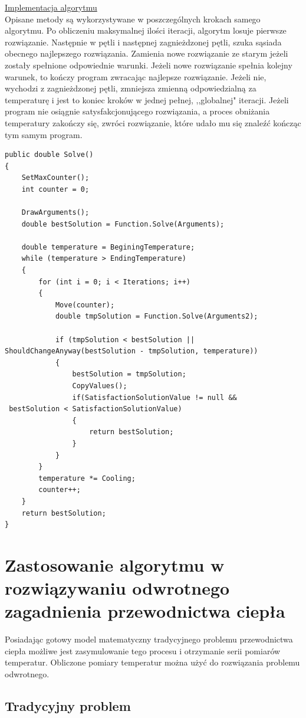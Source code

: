 \documentclass[twoside]{projektInzynierskiMS1}
\newcommand{\si}{ś}
\begin{document}
\underline{Implementacja algorytmu} \\
Opisane metody są wykorzystywane w poszczególnych krokach samego algorytmu. Po obliczeniu maksymalnej ilo\si ci iteracji, algorytm losuje pierwsze rozwiązanie. Następnie w pętli i następnej zagnieżdzonej pętli, szuka sąsiada obecnego najlepszego rozwiązania. Zamienia nowe rozwiązanie ze starym jeżeli zostały spełnione odpowiednie warunki. Jeżeli nowe rozwiązanie spełnia kolejny warunek, to kończy program zwracając najlepsze rozwiązanie. Jeżeli nie, wychodzi z zagnieżdzonej pętli, zmniejsza zmienną odpowiedzialną za temperaturę i jest to koniec kroków w jednej pełnej, ,,globalnej" iteracji. Jeżeli program nie osiągnie satysfakcjonującego rozwiązania, a proces obniżania temperatury zakończy się, zwróci rozwiązanie, które udało mu się znaleźć kończąc tym samym program.

\begin{verbatim}
public double Solve()
{
    SetMaxCounter();
    int counter = 0;

    DrawArguments();
    double bestSolution = Function.Solve(Arguments);

    double temperature = BeginingTemperature;
    while (temperature > EndingTemperature)
    {
        for (int i = 0; i < Iterations; i++)
        {
            Move(counter);
            double tmpSolution = Function.Solve(Arguments2);

            if (tmpSolution < bestSolution || 
ShouldChangeAnyway(bestSolution - tmpSolution, temperature))
            {
                bestSolution = tmpSolution;
                CopyValues();
                if(SatisfactionSolutionValue != null &&
 bestSolution < SatisfactionSolutionValue)
                {
                    return bestSolution;
                }
            }
        }
        temperature *= Cooling;
        counter++;
    }
    return bestSolution;
}
\end{verbatim}

\section{Zastosowanie algorytmu w rozwiązywaniu odwrotnego zagadnienia przewodnictwa ciepła}
Posiadając gotowy model matematyczny tradycyjnego problemu przewodnictwa ciepła możliwe jest zasymulowanie tego procesu i otrzymanie serii pomiarów temperatur. Obliczone pomiary temperatur można użyć do rozwiązania problemu odwrotnego. 
\subsection{Tradycyjny problem}
\end{document}
